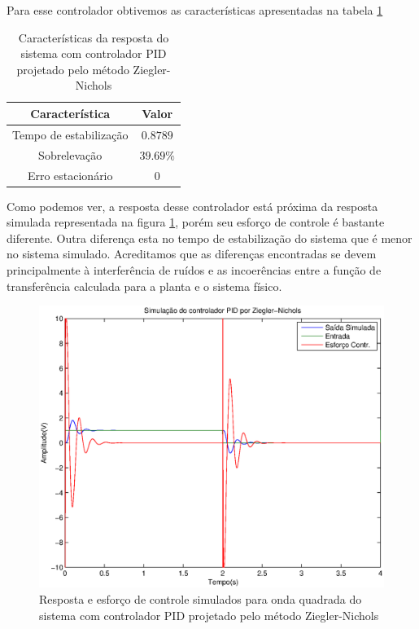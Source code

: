\documentclass{article}
\begin{document}
   Para esse controlador obtivemos as características apresentadas na tabela \ref{tab:pidz}
   \begin{table}[H]
   	\centering
   	\caption{Características da resposta do sistema com controlador PID projetado pelo método Ziegler-Nichols}
   	\label{tab:pidz}
   	\begin{tabular}{|c|c|}
   		\hline Característica & Valor \\ 
   		\hline Tempo de estabilização & $0.8789$\\ %
   		\hline Sobrelevação & $39.69\%$\\ 
   		\hline Erro estacionário & $0$\\ 
   		\hline 
   	\end{tabular} 
   \end{table}
   
   Como podemos ver, a resposta desse controlador está próxima da resposta simulada representada na figura \ref{fig:simpidz}, porém seu esforço de controle é bastante diferente. Outra diferença esta no tempo de estabilização do sistema que é menor no sistema simulado. Acreditamos que as diferenças encontradas se devem principalmente à interferência de ruídos e as incoerências entre a função de transferência calculada para a planta e o sistema físico.
   \begin{figure}[H]
   	\centering
   	\includegraphics[width=0.8\linewidth]{yusimpidz}
   	\caption{Resposta e esforço de controle simulados para onda quadrada do sistema com controlador PID projetado pelo método Ziegler-Nichols}
   	\label{fig:simpidz}
   \end{figure}
   
\end{document}
